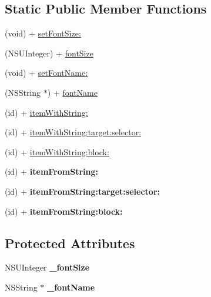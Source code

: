 \subsection*{Static Public Member Functions}
\begin{DoxyCompactItemize}
\item 
(void) + \hyperlink{class_c_c_menu_item_font_a9d5655a6fd45cc758727b1eb057b0b4a}{set\-Font\-Size\-:}
\item 
(N\-S\-U\-Integer) + \hyperlink{class_c_c_menu_item_font_ac0dc8a7cdb7f19d6ea3b7b881d566483}{font\-Size}
\item 
(void) + \hyperlink{class_c_c_menu_item_font_a5b75dfc3067178f9bcc1a87621c10be0}{set\-Font\-Name\-:}
\item 
(N\-S\-String $\ast$) + \hyperlink{class_c_c_menu_item_font_adc901de755879cece69e694ca60d2778}{font\-Name}
\item 
(id) + \hyperlink{class_c_c_menu_item_font_a3a6500b5adbf43e053e35ecfd92fe27f}{item\-With\-String\-:}
\item 
(id) + \hyperlink{class_c_c_menu_item_font_a1edda80c461611ac448bfd44b220ba6f}{item\-With\-String\-:target\-:selector\-:}
\item 
(id) + \hyperlink{class_c_c_menu_item_font_aa7c0c6585ea21770a9828dd5544a52d4}{item\-With\-String\-:block\-:}
\item 
\hypertarget{class_c_c_menu_item_font_aa27049194ee9351acdc9597e85cc3f76}{(id) + {\bfseries item\-From\-String\-:}}\label{class_c_c_menu_item_font_aa27049194ee9351acdc9597e85cc3f76}

\item 
\hypertarget{class_c_c_menu_item_font_ab312812dbe86405e05c3503549fa04a2}{(id) + {\bfseries item\-From\-String\-:target\-:selector\-:}}\label{class_c_c_menu_item_font_ab312812dbe86405e05c3503549fa04a2}

\item 
\hypertarget{class_c_c_menu_item_font_aa994ab94fe5ffc1660d50d74f261177e}{(id) + {\bfseries item\-From\-String\-:block\-:}}\label{class_c_c_menu_item_font_aa994ab94fe5ffc1660d50d74f261177e}

\end{DoxyCompactItemize}
\subsection*{Protected Attributes}
\begin{DoxyCompactItemize}
\item 
\hypertarget{class_c_c_menu_item_font_ab567caaeb445c291f6968cae7b7d11af}{N\-S\-U\-Integer {\bfseries \-\_\-font\-Size}}\label{class_c_c_menu_item_font_ab567caaeb445c291f6968cae7b7d11af}

\item 
\hypertarget{class_c_c_menu_item_font_aade8fd512858335921fa50f5ff72842f}{N\-S\-String $\ast$ {\bfseries \-\_\-font\-Name}}\label{class_c_c_menu_item_font_aade8fd512858335921fa50f5ff72842f}

\end{DoxyCompactItemize}


